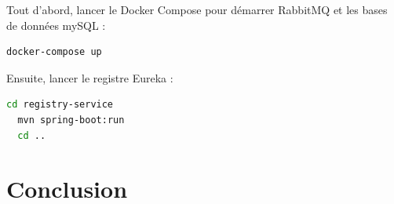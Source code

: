 \documentclass[
  french,
  a4paper,
]{scrartcl}
\begin{document}
Tout d'abord, lancer le Docker Compose pour démarrer RabbitMQ et les bases de données mySQL : 

\begin{lstlisting}[language=bash]
docker-compose up
\end{lstlisting}

Ensuite, lancer le registre Eureka :

\begin{lstlisting}[language=bash]
  cd registry-service
  mvn spring-boot:run
  cd ..
\end{lstlisting}

\section{Conclusion}
 
\end{document}
